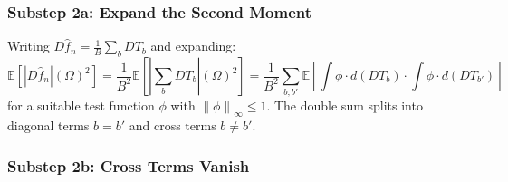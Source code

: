 \documentclass[12pt]{article}
\newcommand{\norm}[1]{\left\| #1 \right\|}
\newcommand{\E}{\mathbb{E}}
\newcommand{\fn}{\hat{f}_n}
\begin{document}
	\subsubsection*{Substep 2a: Expand the Second Moment}
	
	Writing $D\fn = \frac{1}{B}\sum_b DT_b$ and expanding:
	\begin{equation}
		\E\!\left[|D\fn|(\Omega)^2\right]
		= \frac{1}{B^2} \E\!\left[\left|\sum_b DT_b\right|(\Omega)^2\right]
		= \frac{1}{B^2} \sum_{b,b'} \E\!\left[
		\int \phi \cdot d(DT_b) \cdot \int \phi \cdot d(DT_{b'})
		\right]
	\end{equation}
	for a suitable test function $\phi$ with $\norm{\phi}_\infty \leq 1$.
	The double sum splits into diagonal terms $b = b'$ and cross terms
	$b \neq b'$.
	
	\subsubsection*{Substep 2b: Cross Terms Vanish}
	
\end{document}
